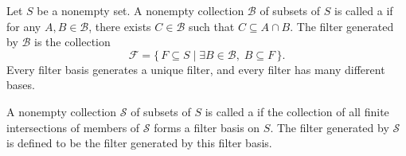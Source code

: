 \begin{definition} \label{definition:filter_basis_and_filter_subbasis}

    Let $S$ be a nonempty set. A nonempty collection $\mathcal{B}$ of subsets of $S$ is called a  if for any $A, B \in \mathcal{B}$, there exists $C \in \mathcal{B}$ such that $C \subseteq A \cap B$. The filter generated by $\mathcal{B}$ is the collection
    $$\mathcal{F} = \{\, F \subseteq S \mid \exists B \in \mathcal{B},\; B \subseteq F \,\}.$$
    Every filter basis generates a unique filter, and every filter has many different bases.

    A nonempty collection $\mathcal{S}$ of subsets of $S$ is called a  if the collection of all finite intersections of members of $\mathcal{S}$ forms a filter basis on $S$. The filter generated by $\mathcal{S}$ is defined to be the filter generated by this filter basis.
\end{definition}
